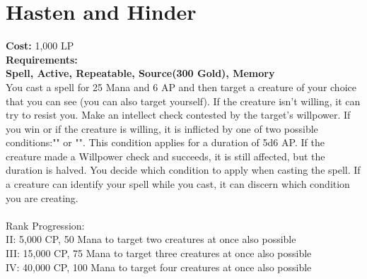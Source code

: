 \section{Hasten and Hinder}\label{spell:hastenHinder}
\textbf{Cost:} 1,000 LP\\
\textbf{Requirements:}\\
\textbf{Spell, Active, Repeatable, Source(300 Gold), Memory}\\
You cast a spell for 25 Mana and 6 AP and then target a creature of your choice that you can see (you can also target yourself).
If the creature isn't willing, it can try to resist you.
Make an intellect check contested by the target's willpower.
If you win or if the creature is willing, it is inflicted by one of two possible conditions:"" or "".
This condition applies for a duration of 5d6 AP.
If the creature made a Willpower check and succeeds, it is still affected, but the duration is halved.
You decide which condition to apply when casting the spell.
If a creature can identify your spell while you cast, it can discern which condition you are creating.\\
\\
Rank Progression:\\
II: 5,000 CP, 50 Mana to target two creatures at once also possible\\
III: 15,000 CP, 75 Mana to target three creatures at once also possible\\
IV: 40,000 CP, 100 Mana to target four creatures at once also possible \\
